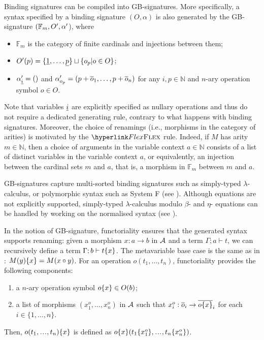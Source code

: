 \begin{example}
\label{ex:gbsig-bsig}Binding signatures can be compiled into GB-signatures.
More specifically, a syntax specified by a binding signature $(O,\alpha)$
is also generated by the GB-signature $(\mathbb{F}_{m},O',\nthaarvecfunct$),
where
\begin{itemize}
\item $\mathbb{F}_{m}$ is the category of finite cardinals and injections
between them;
\item $O'(p)=\{\lcvar 1,\dots,\lcvar p\}\sqcup\{o_{p}|o\in O\}$;
\item $\nthaarvec{\lcvar i}=()$ and $\nthaarvec{o_{p}}=(p+\nthar o1,\dots,p+\nthar on)$
for any $i,p\in\mathbb{N}$ and $n$-ary operation symbol $o\in O$.
\end{itemize}
Note that variables $\lcvar i$ are explicitly specified as nullary
operations and thus do not require a dedicated generating rule, contrary
to what happens with binding signatures. Moreover, the choice of renamings
(i.e., morphisms in the category of arities) is motivated by the $\refrule{Flex}$
rule. Indeed, if $M$ has arity $m\in\mathbb{N}$, then a choice of
arguments in the variable context $a\in\mathbb{N}$ consists of a
list of distinct variables in the variable context $a$, or equivalently,
an injection between the cardinal sets $m$ and $a$, that is, a morphism
in $\mathbb{F}_{m}$ between $m$ and $a$.

GB-signatures capture multi-sorted binding signatures such as simply-typed
$\lambda$-calculus, or polymorphic syntax such as System F (see ).
Although equations are not explicitly supported, simply-typed $\lambda$-calculus
modulo $\beta$- and $\eta$- equations can be handled by working
on the normalised syntax (see ).
\end{example}
%
\begin{remark}
\label{rem:bgsig-functorial}In the notion of GB-signature, functoriality
ensures that the generated syntax supports renaming: given a morphism
$x:a\rightarrow b$ in ${\cal A}$ and a term $\Gamma;a\vdash t$,
we can recursively define a term $\Gamma;b\vdash\rename tx$. The
metavariable base case is the same as in :
$\rename{M(y)}x=M(x\circ y)$. For an operation $o(t_{1},\dots,t_{n})$,
functoriality provides the following components:
\begin{enumerate}
\item a $n$-ary operation symbol $\rename ox\in O(b)$;
\item a list of morphisms $(x_{1}^{o},\dots,x_{n}^{o})$ in ${\cal A}$
such that $\ntharvecaction oxi:\nthar oi\rightarrow\nthar{\rename ox}i$
for each $i\in\{1,\dots,n\}$. 
\end{enumerate}
Then, $\rename{o(t_{1},\mydots,t_{n})}x$ is defined as $\rename ox(\rename{t_{1}}{\ntharvecaction ox1},\mydots,\rename{t_{n}}{\ntharvecaction oxn})$.

\end{remark}
